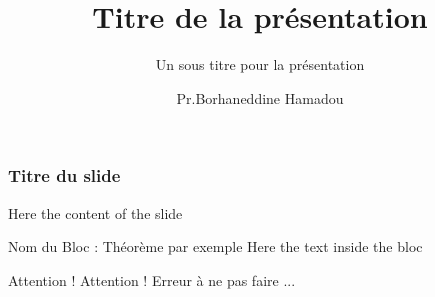 \documentclass{beamer}
\begin{document}
\title{Titre de la présentation}
\subtitle{Un sous titre pour la présentation}
\author{Pr.Borhaneddine Hamadou}
\maketitle

\begin{frame}
\frametitle{Titre du slide}
 Here the content of the slide
 \begin{block}{Nom du Bloc : Théorème par exemple}
  Here the text inside the bloc
 \end{block}
 \begin{alertblock}{Attention !}
 Attention ! Erreur à ne pas faire ...
 \end{alertblock}
\end{frame}
\end{document}
